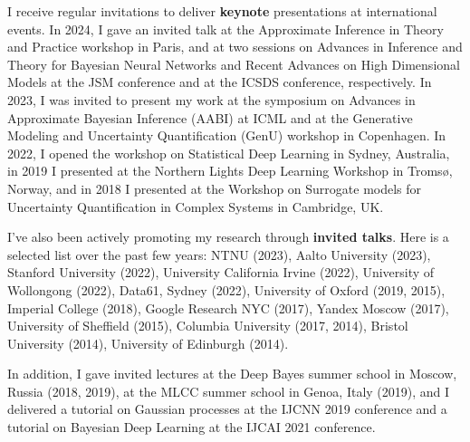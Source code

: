 \documentclass[oneside, a4paper, onecolumn, 10pt]{article}
\begin{document}
I receive regular invitations to deliver {\bf keynote} presentations at international events. 
In 2024, I gave an invited talk at the Approximate Inference in Theory and Practice workshop in Paris, and at two sessions on Advances in Inference and Theory for Bayesian Neural Networks and Recent Advances on High Dimensional Models at the JSM conference and at the ICSDS conference, respectively. 
In 2023, I was invited to present my work at the symposium on Advances in Approximate Bayesian Inference (AABI) at ICML and at the Generative Modeling and Uncertainty Quantification (GenU) workshop in Copenhagen. 
In 2022, I opened the workshop on Statistical Deep Learning in Sydney, Australia, in 2019 I presented at the Northern Lights Deep Learning Workshop in Troms\o, Norway, and in 2018 I presented at the Workshop on Surrogate models for Uncertainty Quantification in Complex Systems in Cambridge, UK.

I've also been actively promoting my research through {\bf invited talks}. 
Here is a selected list over the past few years:
NTNU (2023), Aalto University (2023), Stanford University (2022), University California Irvine (2022), University of Wollongong (2022), Data61, Sydney (2022), University of Oxford (2019, 2015), Imperial College (2018), Google Research NYC (2017), Yandex Moscow (2017), University of Sheffield (2015), Columbia University (2017, 2014), Bristol University (2014), University of Edinburgh (2014). %

In addition, I gave invited lectures at the Deep Bayes summer school in Moscow, Russia (2018, 2019), at the MLCC summer school in Genoa, Italy (2019),
and I delivered a tutorial on Gaussian processes at the IJCNN 2019 conference and a tutorial on Bayesian Deep Learning at the IJCAI 2021 conference. 
\end{document}
